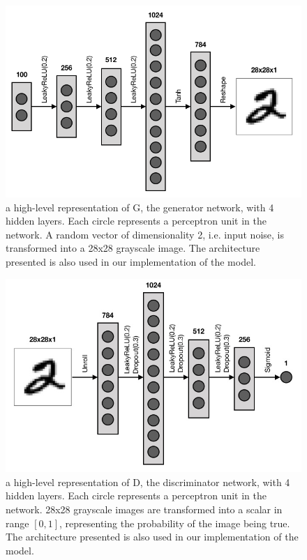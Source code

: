 \begin{figure}
	\begin{center}
		\includegraphics*[scale=0.35]{./plots/G_model.png}	
	\end{center}
	\caption{a high-level representation of G, the generator network, with 4 hidden layers. Each circle represents a perceptron unit in the network. A random vector of dimensionality 2, i.e. input noise, is transformed into a 28x28 grayscale image. The architecture presented is also used in our implementation of the model.}
	\label{fig:netG}
\end{figure}
\begin{figure}
	\begin{center}
		\includegraphics*[scale=0.35]{./plots/D_model.jpg}		
	\end{center}
	\caption{a high-level representation of D, the discriminator network, with 4 hidden layers. Each circle represents a perceptron unit in the network. 28x28 grayscale images are transformed into a scalar in range $[0,1]$, representing the probability of the image being true. The architecture presented is also used in our implementation of the model.}
	\label{fig:netD}
\end{figure}
